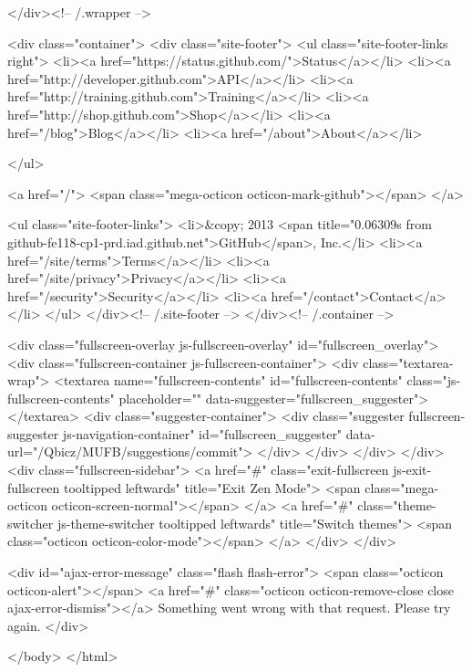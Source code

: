     </div><!-- /.wrapper -->

      <div class="container">
  <div class="site-footer">
    <ul class="site-footer-links right">
      <li><a href="https://status.github.com/">Status</a></li>
      <li><a href="http://developer.github.com">API</a></li>
      <li><a href="http://training.github.com">Training</a></li>
      <li><a href="http://shop.github.com">Shop</a></li>
      <li><a href="/blog">Blog</a></li>
      <li><a href="/about">About</a></li>

    </ul>

    <a href="/">
      <span class="mega-octicon octicon-mark-github"></span>
    </a>

    <ul class="site-footer-links">
      <li>&copy; 2013 <span title="0.06309s from github-fe118-cp1-prd.iad.github.net">GitHub</span>, Inc.</li>
        <li><a href="/site/terms">Terms</a></li>
        <li><a href="/site/privacy">Privacy</a></li>
        <li><a href="/security">Security</a></li>
        <li><a href="/contact">Contact</a></li>
    </ul>
  </div><!-- /.site-footer -->
</div><!-- /.container -->


    <div class="fullscreen-overlay js-fullscreen-overlay" id="fullscreen_overlay">
  <div class="fullscreen-container js-fullscreen-container">
    <div class="textarea-wrap">
      <textarea name="fullscreen-contents" id="fullscreen-contents" class="js-fullscreen-contents" placeholder="" data-suggester="fullscreen_suggester"></textarea>
          <div class="suggester-container">
              <div class="suggester fullscreen-suggester js-navigation-container" id="fullscreen_suggester"
                 data-url="/Qbicz/MUFB/suggestions/commit">
              </div>
          </div>
    </div>
  </div>
  <div class="fullscreen-sidebar">
    <a href="#" class="exit-fullscreen js-exit-fullscreen tooltipped leftwards" title="Exit Zen Mode">
      <span class="mega-octicon octicon-screen-normal"></span>
    </a>
    <a href="#" class="theme-switcher js-theme-switcher tooltipped leftwards"
      title="Switch themes">
      <span class="octicon octicon-color-mode"></span>
    </a>
  </div>
</div>



    <div id="ajax-error-message" class="flash flash-error">
      <span class="octicon octicon-alert"></span>
      <a href="#" class="octicon octicon-remove-close close ajax-error-dismiss"></a>
      Something went wrong with that request. Please try again.
    </div>

  </body>
</html>

